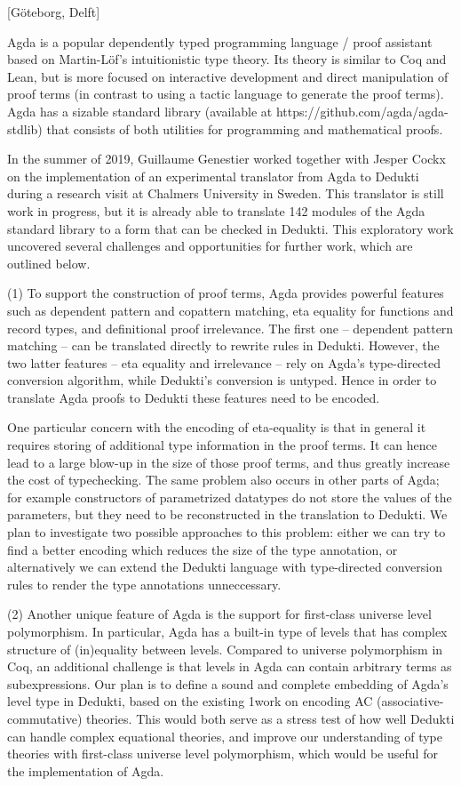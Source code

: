 [G\"oteborg, Delft]

Agda is a popular dependently typed programming language / proof
assistant based on Martin-L\"of’s intuitionistic type theory. Its theory
is similar to Coq and Lean, but is more focused on interactive
development and direct manipulation of proof terms (in contrast to
using a tactic language to generate the proof terms). Agda has a
sizable standard library (available at
https://github.com/agda/agda-stdlib) that consists of both utilities
for programming and mathematical proofs.


In the summer of 2019, Guillaume Genestier worked together with Jesper
Cockx on the implementation of an experimental translator from Agda to
Dedukti during a research visit at Chalmers University in Sweden. This
translator is still work in progress, but it is already able to
translate 142 modules of the Agda standard library to a form that can
be checked in Dedukti. This exploratory work uncovered several
challenges and opportunities for further work, which are outlined
below.

(1) To support the construction of proof terms, Agda provides powerful
features such as dependent pattern and copattern matching, eta
equality for functions and record types, and definitional proof
irrelevance. The first one – dependent pattern matching – can be
translated directly to rewrite rules in Dedukti. However, the two
latter features – eta equality and irrelevance – rely on Agda’s
type-directed conversion algorithm, while Dedukti’s conversion is
untyped. Hence in order to translate Agda proofs to Dedukti these
features need to be encoded.

One particular concern with the encoding of eta-equality is that in
general it requires storing of additional type information in the
proof terms. It can hence lead to a large blow-up in the size of those
proof terms, and thus greatly increase the cost of typechecking. The
same problem also occurs in other parts of Agda; for example
constructors of parametrized datatypes do not store the values of the
parameters, but they need to be reconstructed in the translation to
Dedukti. We plan to investigate two possible approaches to this
problem: either we can try to find a better encoding which reduces the
size of the type annotation, or alternatively we can extend the
Dedukti language with type-directed conversion rules to render the
type annotations unneccessary.

(2) Another unique feature of Agda is the support for first-class
universe level polymorphism. In particular, Agda has a built-in type
of levels that has complex structure of (in)equality between
levels. Compared to universe polymorphism in Coq, an additional
challenge is that levels in Agda can contain arbitrary terms as
subexpressions. Our plan is to define a sound and complete embedding
of Agda’s level type in Dedukti, based on the existing 1work on
encoding AC (associative-commutative) theories. This would both serve
as a stress test of how well Dedukti can handle complex equational
theories, and improve our understanding of type theories with
first-class universe level polymorphism, which would be useful for the
implementation of Agda.

